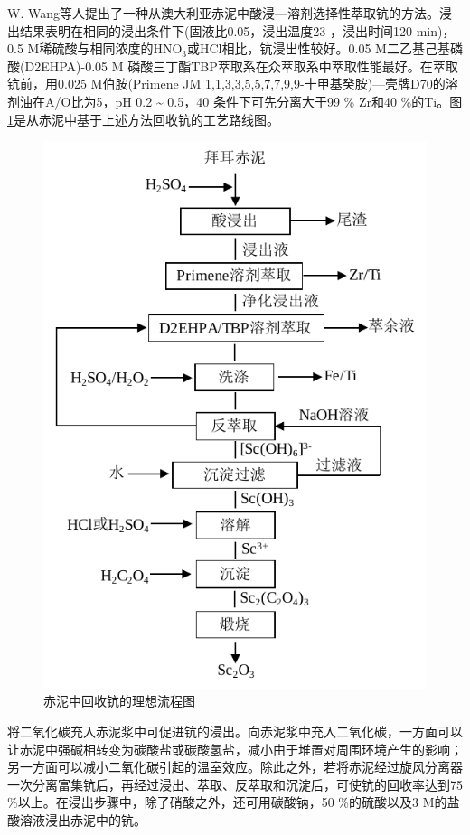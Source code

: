 W. Wang\cite{wang2013recovery}等人提出了一种从澳大利亚赤泥中酸浸—溶剂选择性萃取钪的方法。浸出结果表明在相同的浸出条件下(固液比0.05，浸出温度23 \textcelsius，浸出时间120 min)，0.5 M稀硫酸与相同浓度的HNO$ _{\mathrm{3}} $或HCl相比，钪浸出性较好。0.05 M二乙基己基磷酸(D2EHPA)-0.05 M 磷酸三丁酯TBP萃取系在众萃取系中萃取性能最好。在萃取钪前，用0.025 M伯胺(Primene JM 1,1,3,3,5,5,7,7,9,9-十甲基癸胺)—壳牌D70的溶剂油在A/O比为5，pH 0.2 \textasciitilde{ }0.5，40 \textcelsius 条件下可先分离大于99 \% Zr和40 \%的Ti\cite{wang2013recovery}。图\ref{recoveringScbywangweiwei}是从赤泥中基于上述方法回收钪的工艺路线图。
\begin{figure}[!h]
	\centering
	\includegraphics[width=0.65\linewidth]{Figures/c1/Figure13}%
	\caption{赤泥中回收钪的理想流程图}\label{recoveringScbywangweiwei}
\end{figure}

将二氧化碳充入赤泥浆中可促进钪的浸出\cite{yatsenko2010red}。向赤泥浆中充入二氧化碳，一方面可以让赤泥中强碱相转变为碳酸盐或碳酸氢盐，减小由于堆置对周围环境产生的影响；另一方面可以减小二氧化碳引起的温室效应。除此之外，若将赤泥经过旋风分离器一次分离富集钪后，再经过浸出、萃取、反萃取和沉淀后，可使钪的回收率达到75 \%以上\cite{xiu_fen2003summarization}。在浸出步骤中，除了硝酸之外，还可用碳酸钠，50 \%的硫酸以及3 M的盐酸溶液浸出赤泥中的钪。


